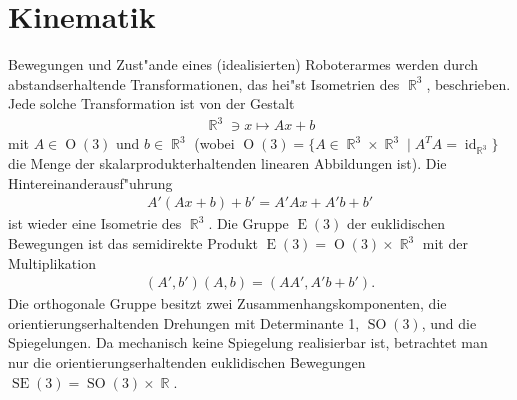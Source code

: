 \documentclass[paper=A4, twoside, chapterprefix=true, bibliography=totoc, headsepline]{scrbook}
\newcommand{\tikzgitter}[3][0.25]{ %
	\draw[step=#1,gray!15] #2 grid #3;
	\draw[step=2*#1,gray!30] #2 grid #3;
	\fill (0,0) circle(0.1); 
}
\DeclareMathOperator{\R}{\mathbb{R}}
\DeclareMathOperator{\id}{id} %
\DeclareMathOperator{\Ee}{E}
\DeclareMathOperator{\Oo}{O} %
\DeclareMathOperator{\SE}{SE}
\DeclareMathOperator{\SO}{SO} %
\newcommand{\X}{\times}
\theoremstyle{nonumberbreak}
\theoremstyle{emptybreak}
\theoremstyle{break}
\begin{document}
\chapter{Kinematik}
\begin{center}\end{center}
Bewegungen und Zust"ande eines (idealisierten) Roboterarmes werden durch abstandserhaltende Transformationen, das hei"st Isometrien des $\R^3$, beschrieben.
Jede solche Transformation ist von der Gestalt
\begin{align*}
    \R^3 \ni x \mapsto Ax + b
\end{align*}
mit $A \in \Oo(3)$ und $b \in \R^3$ (wobei $\Oo(3) = \{A \in \R^3 \X \R^3 \mid A^TA = \id_{\R^3}\}$ die Menge der skalarprodukterhaltenden linearen Abbildungen ist).
Die Hintereinanderausf"uhrung
\begin{align*}
    A' (Ax + b) + b' = A'Ax + A'b + b'
\end{align*}
ist wieder eine Isometrie des $\R^3$.
Die Gruppe $\Ee(3)$ der euklidischen Bewegungen ist das semidirekte Produkt $\Ee(3) = \Oo(3) \X \R^3$ mit der Multiplikation
\begin{align*}
    (A', b') (A, b) = (AA', A'b + b').
\end{align*}
Die orthogonale Gruppe besitzt zwei Zusammenhangskomponenten, die orientierungserhaltenden Drehungen mit Determinante 1, $\SO(3)$, und die Spiegelungen.
Da mechanisch keine Spiegelung realisierbar ist, betrachtet man nur die orientierungserhaltenden euklidischen Bewegungen $\SE(3) = \SO(3) \X \R$.
\end{document}
